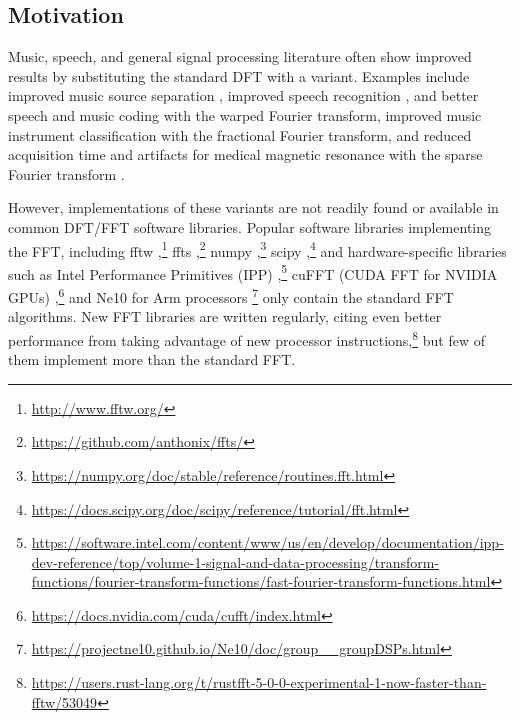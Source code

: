 \documentclass[letter,12pt,notitlepage]{article}
\begin{document}
\subsection{Motivation}

Music, speech, and general signal processing literature often show improved results by substituting the standard DFT with a variant. Examples include improved music source separation \cite{betterbss}, improved speech recognition \cite{bettermfcc}, and better speech and music coding \cite{warpedcomparison} with the warped Fourier transform, improved music instrument classification \cite{betterfractional} with the fractional Fourier transform, and reduced acquisition time and artifacts for medical magnetic resonance with the sparse Fourier transform \cite{bettersparse}.

However, implementations of these variants are not readily found or available in common DFT/FFT software libraries. Popular software libraries implementing the FFT, including fftw \cite{fftw},\footnote{\href{http://www.fftw.org/}{http://www.fftw.org/}} ffts \cite{ffts},\footnote{\href{https://github.com/anthonix/ffts/}{https://github.com/anthonix/ffts/}} numpy \cite{numpy},\footnote{\href{https://numpy.org/doc/stable/reference/routines.fft.html}{https://numpy.org/doc/stable/reference/routines.fft.html}} scipy \cite{scipy},\footnote{\href{https://docs.scipy.org/doc/scipy/reference/tutorial/fft.html}{https://docs.scipy.org/doc/scipy/reference/tutorial/fft.html}} and hardware-specific libraries such as Intel Performance Primitives (IPP) \cite{ipp},\footnote{\href{https://software.intel.com/content/www/us/en/develop/documentation/ipp-dev-reference/top/volume-1-signal-and-data-processing/transform-functions/fourier-transform-functions/fast-fourier-transform-functions.html}{https://software.intel.com/content/www/us/en/develop/documentation/ipp-dev-reference/top/volume-1-signal-and-data-processing/transform-functions/fourier-transform-functions/fast-fourier-transform-functions.html}} cuFFT (CUDA FFT for NVIDIA GPUs) \cite{cufft},\footnote{\href{https://docs.nvidia.com/cuda/cufft/index.html}{https://docs.nvidia.com/cuda/cufft/index.html}} and Ne10 for Arm processors \cite{ne10}\footnote{\href{https://projectne10.github.io/Ne10/doc/group__groupDSPs.html}{https://projectne10.github.io/Ne10/doc/group\_\_groupDSPs.html}} only contain the standard FFT algorithms. New FFT libraries are written regularly, citing even better performance from taking advantage of new processor instructions,\footnote{\href{https://users.rust-lang.org/t/rustfft-5-0-0-experimental-1-now-faster-than-fftw/53049}{https://users.rust-lang.org/t/rustfft-5-0-0-experimental-1-now-faster-than-fftw/53049}} but few of them implement more than the standard FFT.
\end{document}
